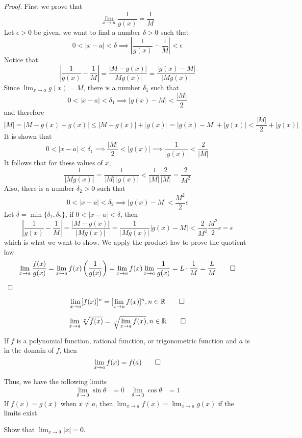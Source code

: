 \begin{proof}
    First we prove that \[\lim_{x\to a}\frac{1}{g(x)}=\frac{1}{M}\]
    Let \(\epsilon>0\) be given,
    we want to find a number \(\delta>0\) such that
    \[0<|x-a|<\delta\implies\left|\frac{1}{g(x)}-\frac{1}{M}\right|<\epsilon\]
    Notice that \[\left|\frac{1}{g(x)}-\frac{1}{M}\right|
    =\frac{|M-g(x)|}{|Mg(x)|}=\frac{|g(x)-M|}{|Mg(x)|}\]
    Since \(\lim_{x\to a}g(x)=M\), there is a number \(\delta_1\) such that
    \[0<|x-a|<\delta_1\implies|g(x)-M|<\frac{|M|}{2}\] and therefore
    \[|M|=|M-g(x)+g(x)|\leq|M-g(x)|+|g(x)|=|g(x)-M|+|g(x)|
    <\frac{|M|}{2}+|g(x)|\]
    It is shown that
    \[0<|x-a|<\delta_1\implies\frac{|M|}{2}<|g(x)|\implies\frac{1}{|g(x)|}
    <\frac{2}{|M|}\]
    It follows that for these values of \(x\),
    \[\frac{1}{|Mg(x)|}=\frac{1}{|M|\,|g(x)|}<\frac{1}{|M|}\frac{2}{|M|}
    =\frac{2}{M^2}\]
    Also, there is a number \(\delta_2>0\) such that
    \[0<|x-a|<\delta_2\implies|g(x)-M|<\frac{M^2}{2}\epsilon\]
    Let \(\delta=\min\{\delta_1,\delta_2\}\), if \(0<|x-a|<\delta\), then
    \[\left|\frac{1}{g(x)}-\frac{1}{M}\right|=\frac{|M-g(x)|}{|Mg(x)|}
    =\frac{1}{|Mg(x)|}|g(x)-M|<\frac{2}{M^2}\frac{M^2}{2}\epsilon=\epsilon\]
    which is what we want to show.
    We apply the product law to prove the quotient law
    \[\lim_{x\to a}\frac{f(x)}{g(x)}
    =\lim_{x\to a}f(x)\left(\frac{1}{g(x)}\right)
    =\lim_{x\to a}f(x)\lim_{x\to a}\frac{1}{g(x)}=L\cdot\frac{1}{M}
    =\frac{L}{M}\qedhere\]
\end{proof}
\begin{theorem}
    \[\lim_{x\to a}[f(x)]^n=[\lim_{x\to a}f(x)]^n,n\in\mathbb{R}\qedhere\]
\end{theorem}
\begin{theorem}
    \[\lim_{x\to a}\sqrt[n]{f(x)}=\sqrt[n]{\lim_{x\to a}f(x)},n\in\mathbb{R}\qedhere\]
\end{theorem}
\begin{theorem}
    If \(f\) is a polynomial function, rational function, or trigonometric
    function and \(a\) is in the domain of \(f\), then
    \[\lim_{x\to a}f(x)=f(a)\qedhere\]
\end{theorem}
Thus, we have the following limits
\begin{align*}
    \lim_{\theta\to 0}\sin\theta &= 0 & \lim_{\theta\to 0}\cos\theta &= 1
\end{align*}
If \(f(x)=g(x)\) when \(x\neq a\),
then \(\lim_{x\to a}f(x)=\lim_{x\to a}g(x)\) if the limits exist.
\begin{problem}
    Show that \(\lim_{x\to 0}|x|=0\).
\end{problem}
